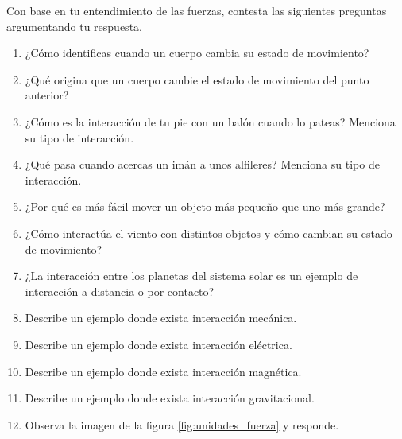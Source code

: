 \documentclass[11pt]{book}
\begin{document}
\begin{boxK}
    Con base en tu entendimiento de las fuerzas, contesta las siguientes preguntas argumentando tu respuesta.

    \begin{enumerate}
        \item ¿Cómo identificas cuando un cuerpo cambia su estado de movimiento?
        \item ¿Qué origina que un cuerpo cambie el estado de movimiento del punto anterior?
        \item ¿Cómo es la interacción de tu pie con un balón cuando lo pateas? Menciona su tipo de interacción.
        \item ¿Qué pasa cuando acercas un imán a unos alfileres? Menciona su tipo de interacción.
        \item ¿Por qué es más fácil mover un objeto más pequeño que uno más grande?
        \item ¿Cómo interactúa el viento con distintos objetos y cómo cambian su estado de movimiento?
        \item ¿La interacción entre los planetas del sistema solar es un ejemplo de interacción a distancia o por contacto?
        \item Describe un ejemplo donde exista interacci\'on mecánica.
        \item Describe un ejemplo donde exista interacci\'on eléctrica.
        \item Describe un ejemplo donde exista interacci\'on magnética.
        \item Describe un ejemplo donde exista interacci\'on gravitacional.
        \item Observa la imagen de la figura \ref{fig:unidades_fuerza} y responde.


\end{enumerate}
\end{boxK}
\end{document}
